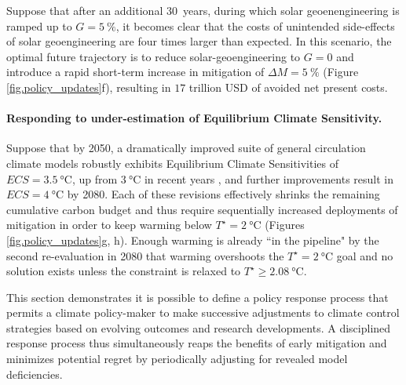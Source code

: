 \documentclass{article}
\begin{document}

Suppose that after an additional \SI{30}{years}, during which solar geoenengineering is ramped up to $G=\SI{5}{\%}$, it becomes clear that the costs of unintended side-effects of solar geoengineering are four times larger than expected. In this scenario, the optimal future trajectory is to reduce solar-geoengineering to $G = 0$ and introduce a rapid short-term increase in mitigation of $\Delta M = \SI{5}{\%}$ (Figure \ref{fig.policy_updates}f), resulting in $17$ trillion USD of avoided net present costs.

\paragraph{Responding to under-estimation of Equilibrium Climate Sensitivity.}
Suppose that by 2050, a dramatically improved suite of general circulation climate models robustly exhibits Equilibrium Climate Sensitivities of $ECS=\SI{3.5}{\celsius}$, up from $\SI{3}{\celsius}$ in recent years \citep{geoffroy_transient_2012}, and further improvements result in $ECS=\SI{4}{\celsius}$ by 2080. Each of these revisions effectively shrinks the remaining cumulative carbon budget and thus require sequentially increased deployments of mitigation in order to keep warming below $T^{\star} = \SI{2}{\celsius}$ (Figures \ref{fig.policy_updates}g, h). Enough warming is already ``in the pipeline" by the second re-evaluation in 2080 that warming overshoots the $T^{\star} = \SI{2}{\celsius}$ goal and no solution exists unless the constraint is relaxed to $T^{\star} \geq \SI{2.08}{\celsius}$.

This section demonstrates it is possible to define a policy response process that permits a climate policy-maker to make successive adjustments to climate control strategies based on evolving outcomes and research developments. A disciplined response process thus simultaneously reaps the benefits of early mitigation and minimizes potential regret by periodically adjusting for revealed model deficiencies.
\end{document}
